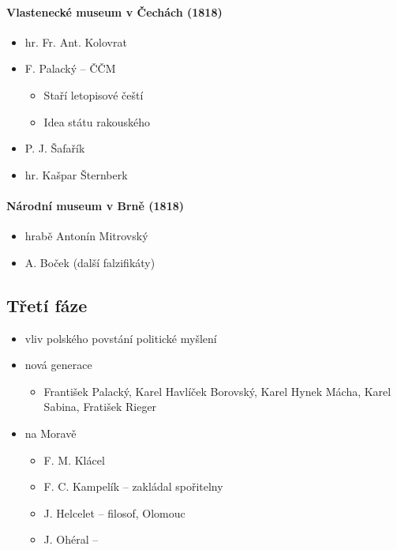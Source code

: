 \paragraph{Vlastenecké museum v Čechách (1818)}
\begin{itemize}
\item hr. Fr. Ant. Kolovrat
\item F. Palacký -- ČČM
	\begin{itemize}
	\item Staří letopisové čeští
	\item Idea státu rakouského
	\end{itemize}
\item P. J. Šafařík
\item hr. Kašpar Šternberk
\end{itemize}

\paragraph{Národní museum v Brně (1818)}
\begin{itemize}
\item hrabě Antonín Mitrovský
\item A. Boček (další falzifikáty)
\end{itemize}


\subsection{Třetí fáze}
\begin{itemize}
\item vliv polského povstání \ra politické myšlení
\item nová generace
	\begin{itemize}
	\item František Palacký, Karel Havlíček Borovský, Karel Hynek Mácha, Karel Sabina, Fratišek Rieger
	\end{itemize}
\item na Moravě
	\begin{itemize}
	\item F. M. Klácel
	\item F. C. Kampelík -- zakládal spořitelny
	\item J. Helcelet -- filosof, Olomouc
	\item J. Ohéral -- 
	\end{itemize}
\end{itemize}

